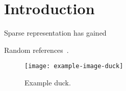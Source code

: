 \chapter{Introduction}\label{ch:introduction}

Sparse representation has gained 

Random references~\cite{Ringlein_2019, Sathe_2016, Malialis_2021}.

\begin{figure}[b!]
    \centering
    \texttt{[image: example-image-duck]}
    \caption[Example duck]{Example duck.}
    \label{fig:example}
\end{figure}